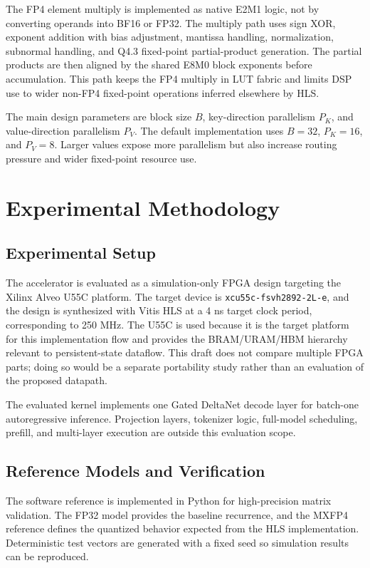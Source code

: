 \documentclass[conference]{IEEEtran}
\begin{document}
The FP4 element multiply is implemented as native E2M1 logic, not by converting operands into BF16 or FP32. The multiply path uses sign XOR, exponent addition with bias adjustment, mantissa handling, normalization, subnormal handling, and Q4.3 fixed-point partial-product generation. The partial products are then aligned by the shared E8M0 block exponents before accumulation. This path keeps the FP4 multiply in LUT fabric and limits DSP use to wider non-FP4 fixed-point operations inferred elsewhere by HLS.

The main design parameters are block size $B$, key-direction parallelism $P_K$, and value-direction parallelism $P_V$. The default implementation uses $B=32$, $P_K=16$, and $P_V=8$. Larger values expose more parallelism but also increase routing pressure and wider fixed-point resource use.

\section{Experimental Methodology}

\subsection{Experimental Setup}
The accelerator is evaluated as a simulation-only FPGA design targeting the Xilinx Alveo U55C platform. The target device is \texttt{xcu55c-fsvh2892-2L-e}, and the design is synthesized with Vitis HLS at a 4 ns target clock period, corresponding to 250 MHz. The U55C is used because it is the target platform for this implementation flow and provides the BRAM/URAM/HBM hierarchy relevant to persistent-state dataflow. This draft does not compare multiple FPGA parts; doing so would be a separate portability study rather than an evaluation of the proposed datapath.

The evaluated kernel implements one Gated DeltaNet decode layer for batch-one autoregressive inference. Projection layers, tokenizer logic, full-model scheduling, prefill, and multi-layer execution are outside this evaluation scope.

\subsection{Reference Models and Verification}
The software reference is implemented in Python for high-precision matrix validation. The FP32 model provides the baseline recurrence, and the MXFP4 reference defines the quantized behavior expected from the HLS implementation. Deterministic test vectors are generated with a fixed seed so simulation results can be reproduced.
\end{document}
